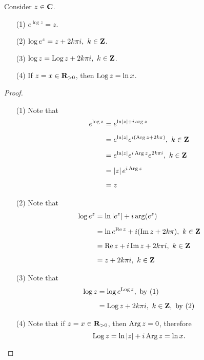 \begin{proposition}\label{proplog}
Consider $z \in \mathbf C$. 
\begin{itemize}
\item[(1)] $e^{\log z} = z$.
\item[(2)] $\log e^z = z + 2k\pi i,\ k \in \mathbf Z$.
\item[(3)] $\log z = \operatorname{Log} z + 2k\pi i,\ k \in \mathbf Z$.
\item[(4)] If $z = x \in \mathbf R_{>0}$, then $\operatorname{Log} z = \ln x$.
\end{itemize}
\end{proposition}
\begin{proof}\hfill
\begin{itemize}
\item[(1)] Note that 
\begin{align*}
e^{\log z} &= e^{\ln\left\lvert z\right\rvert + i\arg z}\\[0.5em]
&= e^{\ln\left\lvert z\right\rvert}e^{i(\operatorname{Arg} z + 2k\pi)},\ k \in \mathbf Z\\[0.5em]
&= e^{\ln\left\lvert z\right\rvert}e^{i\operatorname{Arg} z}e^{2k\pi i},\ k \in \mathbf Z\\[0.5em]
&= \left\lvert z\right\rvert e^{i\operatorname{Arg} z}\\[0.5em]
&= z
\end{align*}
\item[(2)] Note that 
\begin{align*}
\log e^z &= \ln\left\lvert e^z\right\rvert + i\arg(e^z)\\[0.5em]
&= \ln e^{\operatorname{Re} z} + i(\operatorname{Im} z + 2k\pi),\ k \in \mathbf Z\\[0.5em]
&= \operatorname{Re} z + i\operatorname{Im} z + 2k\pi i,\ k \in \mathbf Z\\[0.5em]
&= z + 2k\pi i,\ k \in \mathbf Z
\end{align*}
\item[(3)] Note that
\begin{align*}
\log z &= \log e^{\operatorname{Log} z},\ \text{by (1)}\\[0.5em]
&= \operatorname{Log} z + 2k\pi i,\ k \in \mathbf Z,\ \text{by (2)}
\end{align*}
\item[(4)] Note that if $z = x \in \mathbf R_{>0}$, then $\operatorname{Arg} z = 0$, therefore
\[\operatorname{Log} z = \ln\left\lvert z\right\rvert + i\operatorname{Arg} z = \ln x.\]
\end{itemize}
\vspace*{-\baselineskip}
\end{proof}

\vspace*{1em}

